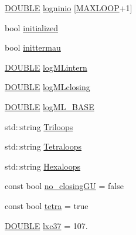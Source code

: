 \begin{DoxyCompactItemize}
\item 
\hyperlink{energy__const_8hh_a8747af38b86aa2bbcda2f1b1aa0888c2}{D\+O\+U\+B\+L\+E} \hyperlink{namespace_rfold_1_1_parameter_a880a22df5673fc8ed0dba9c1d0e7a36e}{logninio} \mbox{[}\hyperlink{energy__const_8hh_ad1bd6eabac419670ddd3c9ed82145988}{M\+A\+X\+L\+O\+O\+P}+1\mbox{]}
\item 
bool \hyperlink{namespace_rfold_1_1_parameter_a34bb77f761084f77aeb4768d23fac3a1}{initialized}
\item 
bool \hyperlink{namespace_rfold_1_1_parameter_a634f9d3c0bb311c6f2fe39b7f32796d2}{inittermau}
\item 
\hyperlink{energy__const_8hh_a8747af38b86aa2bbcda2f1b1aa0888c2}{D\+O\+U\+B\+L\+E} \hyperlink{namespace_rfold_1_1_parameter_aaffae10e935dbf949ce31229a2573784}{log\+M\+Lintern}
\item 
\hyperlink{energy__const_8hh_a8747af38b86aa2bbcda2f1b1aa0888c2}{D\+O\+U\+B\+L\+E} \hyperlink{namespace_rfold_1_1_parameter_a22fb8df2af1e1956624ab4922f582eaa}{log\+M\+Lclosing}
\item 
\hyperlink{energy__const_8hh_a8747af38b86aa2bbcda2f1b1aa0888c2}{D\+O\+U\+B\+L\+E} \hyperlink{namespace_rfold_1_1_parameter_a2b0d9f5b89c56cb544abf4400549e6bf}{log\+M\+L\+\_\+\+B\+A\+S\+E}
\item 
std\+::string \hyperlink{namespace_rfold_1_1_parameter_ad65b27d73071fca1621f7f0cb02cacbc}{Triloops}
\item 
std\+::string \hyperlink{namespace_rfold_1_1_parameter_aae84b42c9bbd350811296e721cf54d34}{Tetraloops}
\item 
std\+::string \hyperlink{namespace_rfold_1_1_parameter_a04c094fec1c14c49a01196be486d4883}{Hexaloops}
\item 
const bool \hyperlink{namespace_rfold_1_1_parameter_a312a98d9462d203bcef26ce195b94bca}{no\+\_\+closing\+G\+U} = false
\item 
const bool \hyperlink{namespace_rfold_1_1_parameter_a38a90dcb0eaf3b35fbed6230d5f8a389}{tetra} = true
\item 
\hyperlink{energy__const_8hh_a8747af38b86aa2bbcda2f1b1aa0888c2}{D\+O\+U\+B\+L\+E} \hyperlink{namespace_rfold_1_1_parameter_a342cc90fdcdcc468a3c7f0817dd5e78d}{lxc37} = 107.
\end{DoxyCompactItemize}


